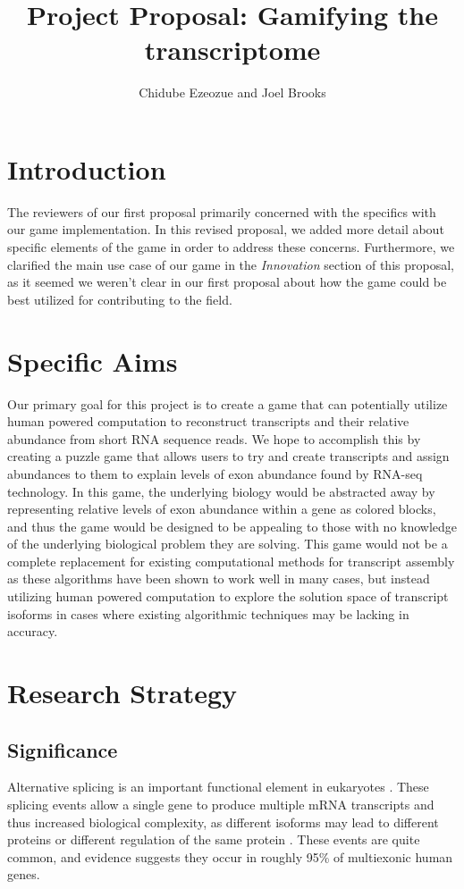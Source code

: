 \documentclass[12pt]{article}
\title{Project Proposal: Gamifying the transcriptome}
\author{Chidube Ezeozue and Joel Brooks}
\begin{document}

\renewcommand\refname{Bibliography}
\maketitle

\section*{Introduction}
The reviewers of our first proposal primarily concerned with the specifics with our game implementation. In this revised proposal, we added more detail about specific elements of the game in order to address these concerns.
Furthermore, we clarified the main use case of our game in the \emph{Innovation} section of this proposal, as it seemed we weren't clear in our first proposal about how the game could be best utilized for contributing to the field.

\section*{Specific Aims}
Our primary goal for this project is to create a game that can potentially utilize human powered computation to reconstruct transcripts and their relative abundance from short RNA sequence reads. We hope to accomplish this by creating a puzzle game that allows users to try and create transcripts and assign abundances to them to explain levels of exon abundance found by RNA-seq technology. In this game, the underlying biology would be abstracted away by representing relative levels of exon abundance within a gene as colored blocks, and thus the game would be designed to be appealing to those with no knowledge of the underlying biological problem they are solving. This game would not be a complete replacement for existing computational methods for transcript assembly as these algorithms have been shown to work well in many cases, but instead utilizing human powered computation to explore the solution space of transcript isoforms in cases where existing algorithmic techniques may be lacking in accuracy.

\section*{Research Strategy}

\subsection*{Significance}
Alternative splicing is an important functional element in eukaryotes \citep{pan2008deep}. These splicing events allow a single gene to produce multiple mRNA transcripts and thus increased biological complexity, as different isoforms may lead to different proteins or different regulation of the same protein \citep{trapnell2010transcript}. These events are quite common, and evidence suggests they occur in roughly 95\% of multiexonic human genes.
\end{document}
